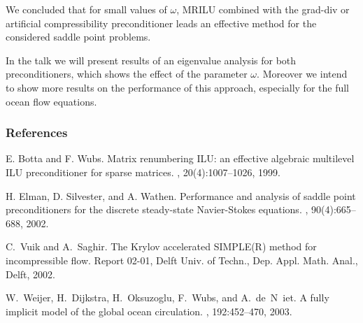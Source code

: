 \documentclass{report}
\begin{document}
We concluded that for small values of $\omega$, MRILU combined
with the grad-div or artificial compressibility preconditioner
leads an effective method for the considered saddle point
problems.

In the talk we will present results of an eigenvalue analysis for
both preconditioners, which shows the effect of the parameter
$\omega$. Moreover we intend to show more results on the
performance of this approach, especially for the full ocean flow
equations.

\subsubsection*{References}
{\small

\noindent
[1] E. Botta and F. Wubs.
\newblock Matrix renumbering {I}{L}{U}: an effective algebraic multilevel
{I}{L}{U} preconditioner for sparse matrices.
, 20(4):1007--1026,
1999.

\noindent
[2] H. Elman, D. Silvester, and A. Wathen.
\newblock Performance and analysis of saddle point preconditioners for the
discrete steady-state {N}avier-{S}tokes equations.
, 90(4):665--688, 2002.

\noindent
[3] C.~Vuik and A.~Saghir.
\newblock The {K}rylov accelerated {SIMPLE(R)} method for incompressible flow.
\newblock Report 02-01, Delft Univ. of Techn., Dep. Appl. Math. Anal., Delft, 2002.

\noindent
[4] W.~Weijer, H.~Dijkstra, H.~Oksuzoglu, F.~Wubs, and
A.~de~N~iet.
\newblock A fully implicit model of the global ocean circulation.
, 192:452--470, 2003.
}
\end{document}

